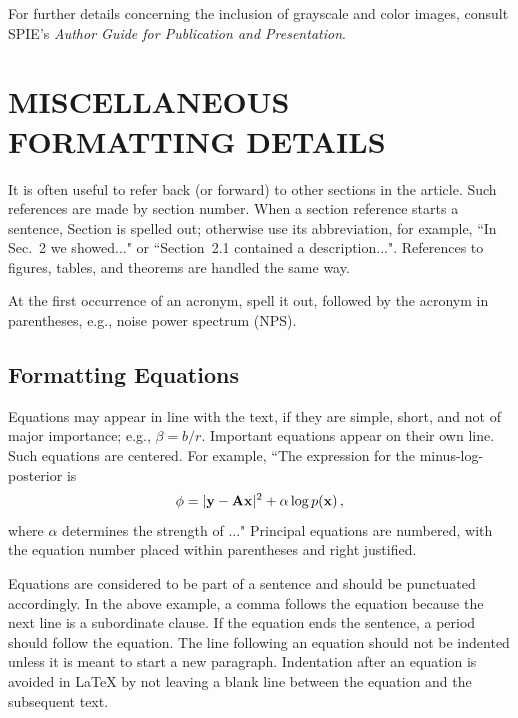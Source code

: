 \documentclass[]{spie}  %
\begin{document}
For further details concerning the inclusion of grayscale and color
images, consult SPIE's {\it Author Guide for Publication and
  Presentation}.
 
\appendix    %
\section{MISCELLANEOUS FORMATTING DETAILS} \label{sec:misc}

It is often useful to refer back (or forward) to other sections in the article.  Such references are made by section number.  When a section reference starts a sentence, Section is spelled out; otherwise use its abbreviation, for example, ``In Sec.~2 we showed..." or ``Section~2.1 contained a description...".  References to figures, tables, and theorems are handled the same way.

At the first occurrence of an acronym, spell it out, followed by the acronym in parentheses, e.g., noise power spectrum (NPS).  
 
\subsection{Formatting Equations} 
Equations may appear in line with the text, if they are simple, short, and not of major importance; e.g., $\beta = b/r$.  Important equations appear on their own line.  Such equations are centered.  For example, ``The expression for the minus-log-posterior is
	\begin{equation}
	\label{eq:alpha}
\phi = |{\rm\bf y} - {\rm\bf A}{\rm\bf x}|^2 + \alpha \log p({\rm\bf x}) \, ,
	\end{equation}
where $\alpha$ determines the strength of ..."  Principal equations are numbered, with the equation number placed within parentheses and right justified.  

Equations are considered to be part of a sentence and should be punctuated accordingly. In the above example, a comma follows the equation because the next line is a subordinate clause.  If the equation ends the sentence, a period should follow the equation.  The line following an equation should not be indented unless it is meant to start a new paragraph.  Indentation after an equation is avoided in LaTeX by not leaving a blank line between the equation and the subsequent text.
\end{document}
